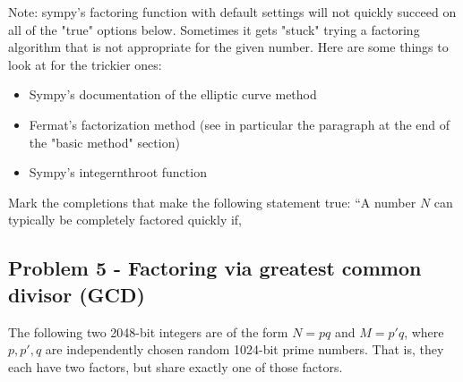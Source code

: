 Note: sympy's factoring function with default settings will not quickly succeed on all of the "true" options below. Sometimes it gets "stuck" trying a factoring algorithm that is not appropriate for the given number. Here are some things to look at for the trickier ones:
\begin{itemize}
    \item Sympy's documentation of the elliptic curve method
    \item Fermat's factorization method (see in particular the paragraph at the end of the "basic method" section)
    \item Sympy's integernthroot function
\end{itemize}


Mark the completions that make the following statement true: ``A number $N$ can typically be completely factored quickly if, \\
\noindent{}

\newpage
\subsection{Problem 5 - Factoring via greatest common divisor (GCD)}
The following two 2048-bit integers are of the form $N=pq$ and $M=p'q$, where $p,p',q$ are independently chosen random 1024-bit prime numbers. That is, they each have two factors, but share exactly one of those factors. \\

